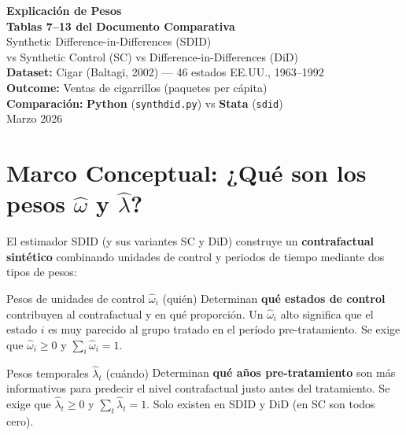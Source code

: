 \documentclass[11pt, a4paper]{article}
\newcommand{\py}{\textcolor{pyblue}{\textbf{Python}}}
\newcommand{\st}{\textcolor{stgreen}{\textbf{Stata}}}
\begin{document}
\begin{titlepage}
  \centering
  \vspace*{2.5cm}
  {\LARGE\bfseries Explicación de Pesos\\[0.5em]
  Tablas 7--13 del Documento Comparativa\\[1em]}
  {\large Synthetic Difference-in-Differences (SDID)\\
  vs Synthetic Control (SC) vs Difference-in-Differences (DiD)\\[1.5em]}
  {\normalsize
    \textbf{Dataset:} Cigar (Baltagi, 2002) — 46 estados EE.UU., 1963--1992\\[0.3em]
    \textbf{Outcome:} Ventas de cigarrillos (paquetes per cápita)\\[0.3em]
    \textbf{Comparación:} \py{} (\texttt{synthdid.py}) vs \st{} (\texttt{sdid})\\[2em]
  }
  \vfill
  {\small Marzo 2026}
\end{titlepage}

\tableofcontents
\newpage

\section{Marco Conceptual: ¿Qué son los pesos $\hat{\omega}$ y $\hat{\lambda}$?}

El estimador SDID (y sus variantes SC y DiD) construye un \textbf{contrafactual sintético}
combinando unidades de control y periodos de tiempo mediante dos tipos de pesos:

\begin{concepto}{Pesos de unidades de control $\hat{\omega}_i$ (quién)}
Determinan \textbf{qué estados de control} contribuyen al contrafactual y en qué proporción.
Un $\hat{\omega}_i$ alto significa que el estado $i$ es muy parecido al grupo tratado
en el período pre-tratamiento. Se exige que $\hat{\omega}_i \geq 0$ y $\sum_i \hat{\omega}_i = 1$.
\end{concepto}

\begin{concepto}{Pesos temporales $\hat{\lambda}_t$ (cuándo)}
Determinan \textbf{qué años pre-tratamiento} son más informativos para predecir el
nivel contrafactual justo antes del tratamiento. Se exige que $\hat{\lambda}_t \geq 0$
y $\sum_t \hat{\lambda}_t = 1$. Solo existen en SDID y DiD (en SC son todos cero).
\end{concepto}
\end{document}
